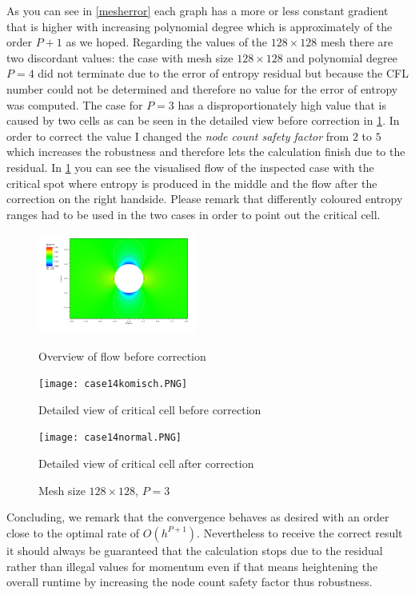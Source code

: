 	As you can see in \ref{mesherror} each graph has a more or less constant gradient that is higher with increasing polynomial degree which is approximately of the order $P+1$ as we hoped. Regarding the values of the $128 \times 128$ mesh there are two discordant values: the case with mesh size $128 \times 128$ and polynomial degree $P = 4$ did not terminate due to the error of entropy residual but because the CFL number could not be determined and therefore no value for the error of entropy was computed. The case for $P = 3$ has a disproportionately high value that is caused by two cells as can be seen in the detailed view before correction in \ref{fig:case14}. In order to correct the value I changed the \textit{node count safety factor} from $2$ to $5$ which increases the robustness and therefore lets the calculation finish due to the residual. In \ref{fig:case14} you can see the visualised flow of the inspected case with the critical spot where entropy is produced in the middle and the flow after the correction on the right handside. Please remark that differently coloured entropy ranges had to be used in the two cases in order to point out the critical cell.

	\begin{figure}[htp]
		\centering
		\begin{minipage}[b]{0.28\textwidth}
			\centering
			\includegraphics[height=3.3cm]{img/case14.PNG}
			\caption*{Overview of flow before correction}
		\end{minipage}
		\quad
		\begin{minipage}[b]{0.28\textwidth}
			\centering
			\texttt{[image: case14komisch.PNG]}
			\caption*{Detailed view of critical cell before correction}
			\label{fig:case14detail}
		\end{minipage}
		\quad
		\begin{minipage}[b]{0.28\textwidth}
			\centering
			\texttt{[image: case14normal.PNG]}
			\caption*{Detailed view of critical cell after correction}
			\label{fig:case14detailneu}
		\end{minipage}
		\caption{Mesh size $128 \times 128$, $P = 3$}
		\label{fig:case14}
	\end{figure}
	
	Concluding, we remark that the convergence behaves as desired with an order close to the optimal rate of $O(h^{P+1})$. Nevertheless to receive the correct result it should always be guaranteed that the calculation stops due to the residual rather than illegal values for momentum even if that means heightening the overall runtime by increasing the node count safety factor thus robustness.
	
